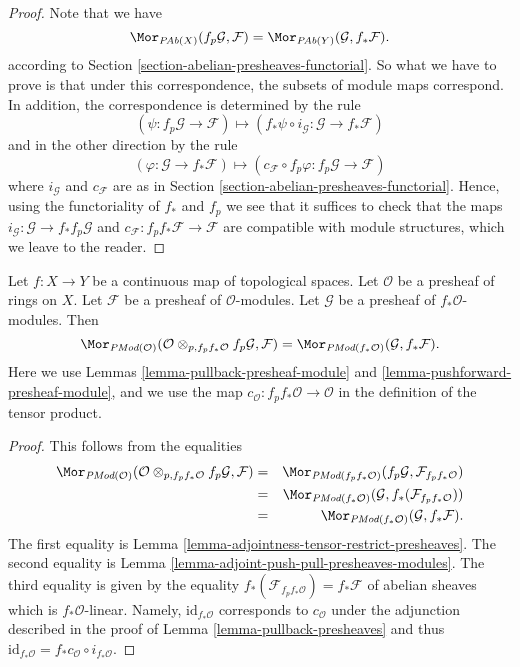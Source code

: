 \begin{proof}
Note that we have
$$
\Mor_{\textit{PAb}(X)}(f_p\mathcal{G}, \mathcal{F})
=
\Mor_{\textit{PAb}(Y)}(\mathcal{G}, f_*\mathcal{F}).
$$
according to Section \ref{section-abelian-presheaves-functorial}.
So what we have to prove is that under this correspondence, the
subsets of module maps correspond. In addition, the correspondence
is determined by the rule
$$
(\psi : f_p\mathcal{G} \to \mathcal{F})
\longmapsto
(f_*\psi \circ i_\mathcal{G} :
\mathcal{G} \to f_* \mathcal{F})
$$
and in the other direction by the rule
$$
(\varphi : \mathcal{G} \to f_* \mathcal{F})
\longmapsto
(c_\mathcal{F} \circ f_p\varphi : f_p\mathcal{G} \to \mathcal{F})
$$
where $i_\mathcal{G}$ and $c_\mathcal{F}$ are as in
Section \ref{section-abelian-presheaves-functorial}.
Hence, using the functoriality of $f_*$ and $f_p$ we see that
it suffices to check that the maps
$i_\mathcal{G} : \mathcal{G} \to f_* f_p \mathcal{G}$ and
$c_\mathcal{F} : f_p f_* \mathcal{F} \to \mathcal{F}$
are compatible with module structures, which we leave to the reader.
\end{proof}

\begin{lemma}
\label{lemma-adjoint-pull-push-presheaves-modules}
Let $f : X \to Y$ be a continuous map of topological spaces.
Let $\mathcal{O}$ be a presheaf of rings on $X$.
Let $\mathcal{F}$ be a presheaf of $\mathcal{O}$-modules.
Let $\mathcal{G}$ be a presheaf of $f_*\mathcal{O}$-modules.
Then
$$
\Mor_{\textit{PMod}(\mathcal{O})}(
\mathcal{O} \otimes_{p, f_pf_*\mathcal{O}} f_p\mathcal{G}, \mathcal{F})
=
\Mor_{\textit{PMod}(f_*\mathcal{O})}(\mathcal{G}, f_*\mathcal{F}).
$$
Here we use
Lemmas \ref{lemma-pullback-presheaf-module}
and \ref{lemma-pushforward-presheaf-module}, and we use
the map $c_\mathcal{O} : f_pf_*\mathcal{O} \to \mathcal{O}$
in the definition of the tensor product.
\end{lemma}

\begin{proof}
This follows from the equalities
\begin{eqnarray*}
\Mor_{\textit{PMod}(\mathcal{O})}(
\mathcal{O} \otimes_{p, f_pf_*\mathcal{O}} f_p\mathcal{G}, \mathcal{F})
& = &
\Mor_{\textit{PMod}(f_pf_*\mathcal{O})}(
f_p\mathcal{G}, \mathcal{F}_{f_pf_*\mathcal{O}}) \\
& = &
\Mor_{\textit{PMod}(f_*\mathcal{O})}(\mathcal{G},
f_*(\mathcal{F}_{f_pf_*\mathcal{O}})) \\
& = &
\Mor_{\textit{PMod}(f_*\mathcal{O})}(\mathcal{G}, f_*\mathcal{F}).
\end{eqnarray*}
The first equality is
Lemma \ref{lemma-adjointness-tensor-restrict-presheaves}.
The second equality is
Lemma \ref{lemma-adjoint-push-pull-presheaves-modules}.
The third equality is given by the equality
$f_*(\mathcal{F}_{f_pf_*\mathcal{O}}) = f_*\mathcal{F}$
of abelian sheaves which is $f_*\mathcal{O}$-linear. Namely,
$\text{id}_{f_*\mathcal{O}}$ corresponds to $c_\mathcal{O}$
under the adjunction described in the proof of
Lemma \ref{lemma-pullback-presheaves}
and thus
$\text{id}_{f_*\mathcal{O}} = f_*c_\mathcal{O} \circ i_{f_*\mathcal{O}}$.
\end{proof}

